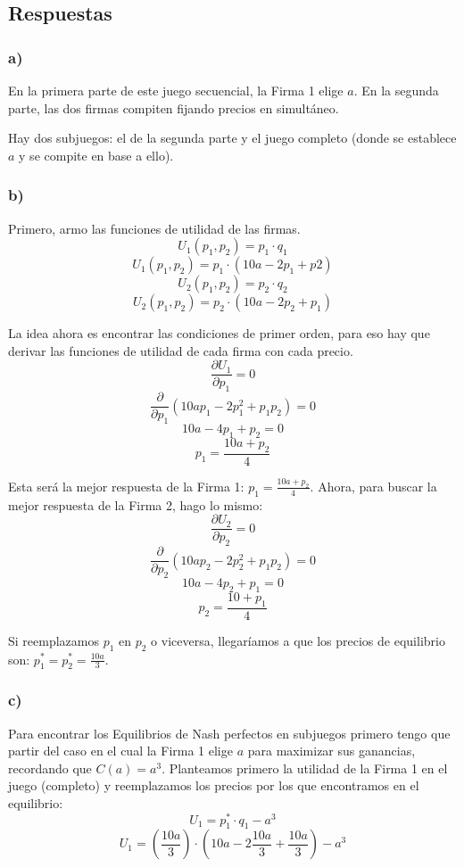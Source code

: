 \documentclass{article}
\begin{document}
        \subsection*{Respuestas}
            \subsubsection*{a)}
                En la primera parte de este juego secuencial, la Firma 1 elige $a$. En la segunda parte, las dos firmas compiten fijando precios en simultáneo.

                Hay dos subjuegos: el de la segunda parte y el juego completo (donde se establece $a$ y se compite en base a ello).

            \subsubsection*{b)}
                Primero, armo las funciones de utilidad de las firmas.
                \[U_{1}(p_{1}, p_{2}) = p_{1} \cdot q_{1}\]
                \[U_{1}(p_{1}, p_{2}) = p_{1} \cdot (10a-2p_{1}+p2)\]
                \[U_{2}(p_{1}, p_{2}) = p_{2} \cdot q_{2}\]
                \[U_{2}(p_{1}, p_{2}) = p_{2} \cdot (10a-2p_{2}+p_{1})\]

                La idea ahora es encontrar las condiciones de primer orden, para eso hay que derivar las funciones de utilidad de cada firma con cada precio.
                \[\frac{\partial U_{1}}{\partial p_{1}} = 0\]
                \[\frac{\partial}{\partial p_{1}}(10ap_{1}-2p^{2}_{1}+p_{1}p_{2}) = 0\]
                \[10a-4p_{1}+p_{2} = 0\]
                \[p_{1} = \frac{10a+p_{2}}{4}\]

                Esta será la mejor respuesta de la Firma 1: $p_{1} = \frac{10a+p_{2}}{4}$. Ahora, para buscar la mejor respuesta de la Firma 2, hago lo mismo:
                \[\frac{\partial U_{2}}{\partial p_{2}} = 0\]
                \[\frac{\partial}{\partial p_{2}}(10ap_{2}-2p^{2}_{2}+p_{1}p_{2}) = 0\]
                \[10a-4p_{2}+p_{1} = 0\]
                \[p_{2} = \frac{10+p_{1}}{4}\]

                Si reemplazamos $p_{1}$ en $p_{2}$ o viceversa, llegaríamos a que los precios de equilibrio son: $p_{1}^{*} = p_{2}^{*} = \frac{10a}{3}$.
                
            \subsubsection*{c)}
                Para encontrar los Equilibrios de Nash perfectos en subjuegos primero tengo que partir del caso en el cual la Firma 1 elige $a$ para maximizar sus ganancias, recordando que $C(a) = a^3$. Planteamos primero la utilidad de la Firma 1 en el juego (completo) y reemplazamos los precios por los que encontramos en el equilibrio:
                \[U_{1} = p_{1}^{*} \cdot q_{1} - a^{3}\]
                \[U_{1} = (\frac{10a}{3}) \cdot (10a-2\frac{10a}{3}+\frac{10a}{3})-a^{3}\]
\end{document}
